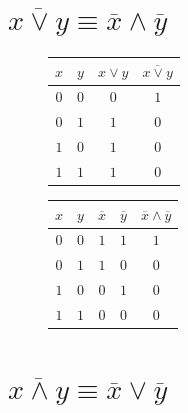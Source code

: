 \documentclass[12pt,a4paper]{article}
\theoremstyle{plain}
\theoremstyle{definition}
\theoremstyle{remark}
\numberwithin{equation}{section}
\begin{document}
\section{$\overline{x \lor y} \equiv \overline{x} \land \overline{y}$} 

\begin{figure}[H]
  \begin{minipage}[t]{0.45\textwidth}
    \vspace{0em}    
    \begin{tabularx}{\linewidth}{|C|C|C|C|}
      \hline
      $x$ & $y$ & $x \lor y$ & $\overline{x \lor y}$ \\
      \hline
      $0$ & $0$ & $0$ & $1$ \\
      $0$ & $1$ & $1$ & $0$ \\
      $1$ & $0$ & $1$ & $0$ \\
      $1$ & $1$ & $1$ & $0$ \\
      \hline
    \end{tabularx}
  \end{minipage} \hfill
  \begin{minipage}[t]{0.05\textwidth}
    \hspace{0em}
    \vspace{2.5em}

    \resizebox{\textwidth}{\textwidth}{$\equiv$}
  \end{minipage} \hfill
  \begin{minipage}[t]{0.45\textwidth}
    \vspace{0em}
    \begin{tabularx}{\linewidth}{|C|C|C|C|C|}
      \hline
      $x$ & $y$ & $\overline{x}$ & $\overline{y}$ & $\overline{x} \land \overline{y}$ \\
      \hline
      $0$ & $0$ & $1$ & $1$ & $1$ \\
      $0$ & $1$ & $1$ & $0$ & $0$ \\
      $1$ & $0$ & $0$ & $1$ & $0$ \\
      $1$ & $1$ & $0$ & $0$ & $0$ \\
      \hline
    \end{tabularx}
  \end{minipage}
\end{figure}

\section{$\overline{x \land y} \equiv \overline{x} \lor \overline{y}$}
\end{document}
